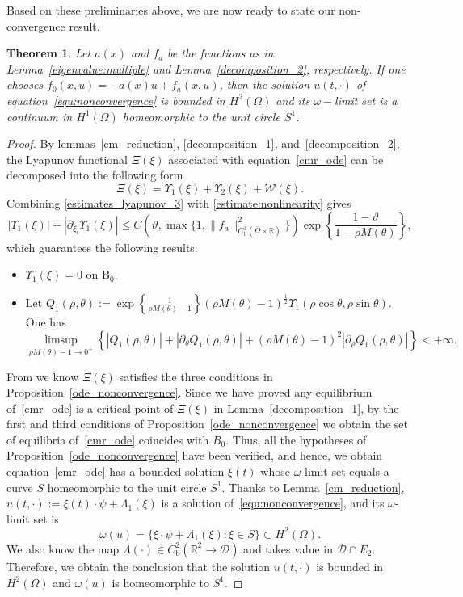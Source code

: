 \documentclass{elsarticle}
\newtheorem{theorem}{Theorem}[section]
\begin{document}
Based on these preliminaries above, we are now ready to state our non-convergence result.

\begin{theorem}\label{thm:main1}
Let $a(x)$ and $f_a$ be the functions as in Lemma~\ref{eigenvalue:multiple} and Lemma~\ref{decomposition_2}, respectively. If one chooses $f_0(x, u) = -a(x)u + f_a(x, u)$, then the solution $u(t, \cdot)$ of equation~\eqref{equ:nonconvergence} is bounded in $H^2(\Omega)$ and its $\omega-$limit set is a continuum in $H^1(\Omega)$ homeomorphic to the unit circle $S^1$.
\end{theorem}
\begin{proof}
By lemmas~\ref{cm_reduction}, \ref{decomposition_1}, and~\ref{decomposition_2}, the Lyapunov functional $\Xi(\xi)$ associated with equation~\ref{cmr_ode} can be decomposed into the following form
\[
	\Xi(\xi) = \Upsilon_1(\xi) + \Upsilon_2(\xi) + \mathcal{W}(\xi).
\]
Combining \eqref{estimates_lyapunov_3} with \eqref{estimate:nonlinearity} gives 
\[
|\Upsilon_1(\xi)| + |\partial_{\xi_i}\Upsilon_1(\xi)|\leqslant C(\vartheta, \max\{1, \|f_a\|^2_{C^3_{\mathrm{b}}(\bar{\Omega}\times\mathbb{R})}\})\exp\left\{ \frac{1-\vartheta}{1- \rho M(\theta)} \right\},
\]
which guarantees the following results: 
\begin{itemize}
\item[-] $\Upsilon_1(\xi) = 0$ on $\mathrm{B}_{0}$.
\item[-] Let $Q_1(\rho, \theta) := \exp\left\{\frac{1}{\rho M(\theta)-1}\right\}\left(\rho M(\theta)-1\right)^{\frac{1}{2}}\Upsilon_1 (\rho\cos\theta, \rho\sin\theta)$. One has 
\[
	\limsup_{\rho M(\theta)-1\rightarrow 0^{+}}\left\{ |Q_1(\rho, \theta)| + |\partial_{\theta}Q_1(\rho, \theta)| + (\rho M(\theta)-1)^2|\partial_{\rho}Q_1(\rho, \theta)|\right\} < +\infty.
\]
\end{itemize}
From \cite[Lemma 2.3]{polavcik2002nonconvergent} we know $\Xi(\xi)$ satisfies the three conditions in Proposition~\ref{ode_nonconvergence}. Since we have proved any equilibrium of~\eqref{cmr_ode} is a critical point of $\Xi(\xi)$ in Lemma~\ref{decomposition_1}, by the first and third conditions of Proposition~\ref{ode_nonconvergence} we obtain the set of equilibria of~\eqref{cmr_ode} coincides with $B_{0}$. Thus, all the hypotheses of Proposition~\ref{ode_nonconvergence} have been verified, and hence, we obtain equation~\eqref{cmr_ode} has a bounded solution $\xi(t)$ whose $\omega$-limit set equals a curve $S$ homeomorphic to the unit circle $S^1$. Thanks to Lemma~\ref{cm_reduction}, $u(t, \cdot):=\xi(t)\cdot\psi + \Lambda_1(\xi)$ is a solution of~\eqref{equ:nonconvergence}, and its $\omega$-limit set is
\[
	\omega(u) = \{\xi\cdot\psi + \Lambda_1(\xi): \xi\in S\}\subset H^2(\Omega).
\]
We also know the map $\Lambda(\cdot)\in C^2_{\mathrm{b}}(\mathbb{R}^2\rightarrow\mathcal{D})$ and takes value in $\mathcal{D}\cap E_2$. Therefore, we obtain the conclusion that the solution $u(t, \cdot)$ is bounded in $H^2(\Omega)$ and $\omega(u)$ is homeomorphic to $S^1$. 
\end{proof}
\end{document}
